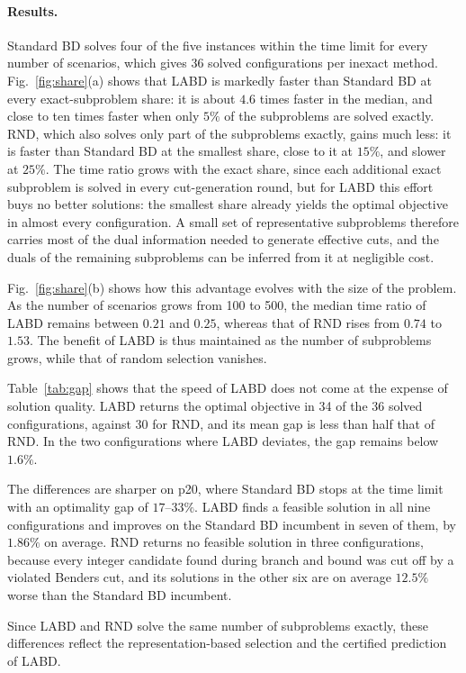 \paragraph{Results.} Standard BD solves four of the five instances within the time limit for every number of scenarios, which gives 36 solved configurations per inexact method. Fig.~\ref{fig:share}(a) shows that LABD is markedly faster than Standard BD at every exact-subproblem share: it is about $4.6$ times faster in the median, and close to ten times faster when only $5\%$ of the subproblems are solved exactly. RND, which also solves only part of the subproblems exactly, gains much less: it is faster than Standard BD at the smallest share, close to it at $15\%$, and slower at $25\%$. The time ratio grows with the exact share, since each additional exact subproblem is solved in every cut-generation round, but for LABD this effort buys no better solutions: the smallest share already yields the optimal objective in almost every configuration. A small set of representative subproblems therefore carries most of the dual information needed to generate effective cuts, and the duals of the remaining subproblems can be inferred from it at negligible cost.

Fig.~\ref{fig:share}(b) shows how this advantage evolves with the size of the problem. As the number of scenarios grows from 100 to 500, the median time ratio of LABD remains between $0.21$ and $0.25$, whereas that of RND rises from $0.74$ to $1.53$. The benefit of LABD is thus maintained as the number of subproblems grows, while that of random selection vanishes.

Table~\ref{tab:gap} shows that the speed of LABD does not come at the expense of solution quality. LABD returns the optimal objective in 34 of the 36 solved configurations, against 30 for RND, and its mean gap is less than half that of RND. In the two configurations where LABD deviates, the gap remains below $1.6\%$.

The differences are sharper on p20, where Standard BD stops at the time limit with an optimality gap of $17$--$33\%$. LABD finds a feasible solution in all nine configurations and improves on the Standard BD incumbent in seven of them, by $1.86\%$ on average. RND returns no feasible solution in three configurations, because every integer candidate found during branch and bound was cut off by a violated Benders cut, and its solutions in the other six are on average $12.5\%$ worse than the Standard BD incumbent.

Since LABD and RND solve the same number of subproblems exactly, these differences reflect the representation-based selection and the certified prediction of LABD.
